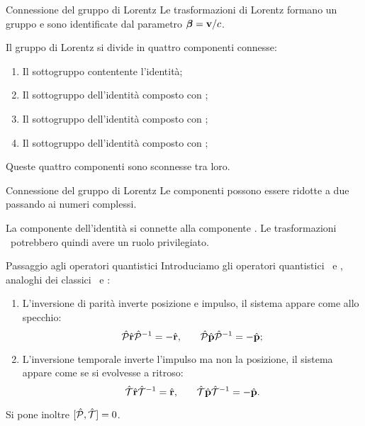 \begin{frame}{Connessione del gruppo di Lorentz}
    Le trasformazioni di Lorentz formano un gruppo e sono identificate dal parametro $\vb*{\beta} = \vb{v}/c$.

    \pause
    Il gruppo di Lorentz si divide in quattro componenti connesse:
    \begin{enumerate}[label=\mybullet]
        \pause
        \item Il sottogruppo contentente l'identità;
        \pause
        \item Il sottogruppo dell'identità composto con \mcP;
        \item Il sottogruppo dell'identità composto con \mcT;
        \item Il sottogruppo dell'identità composto con \mcP\mcT;
    \end{enumerate}
    \pause
    Queste quattro componenti sono sconnesse tra loro.
    
        
\end{frame}

\begin{frame}{Connessione del gruppo di Lorentz}
    Le componenti possono essere ridotte a due passando ai numeri complessi.
    \begin{figure}
        \qquad\pause
    \end{figure}
    \pause
    La componente dell'identità si connette alla componente \PT.
    \pause
    Le trasformazioni \PT\ potrebbero quindi avere un ruolo privilegiato.
\end{frame}

\begin{frame}{Passaggio agli operatori quantistici}
    Introduciamo gli operatori quantistici \hP\ e \hT, analoghi dei classici \mcP\ e \mcT :
    \begin{enumerate}[label=\mybullet]
        \pause
        \item L'inversione di parità inverte posizione e impulso, il sistema appare come allo specchio:
            \begin{equation*}
                \mathcal{\hat{P}}\hat{\vb{r}}\mathcal{\hat{P}}^{-1} = -\hat{\vb{r}}
                \text{,}
                \qquad
                \mathcal{\hat{P}}\hat{\vb{p}}\mathcal{\hat{P}}^{-1} = -\hat{\vb{p}}
                \text{;}
            \end{equation*}
        \pause
        \item L'inversione temporale inverte l'impulso ma non la posizione, il sistema appare come se si evolvesse a ritroso:
            \begin{equation*}
                \mathcal{\hat{T}}\hat{\vb{r}}\mathcal{\hat{T}}^{-1} = \hat{\vb{r}}
                \text{,}
                \qquad
                \mathcal{\hat{T}}\hat{\vb{p}}\mathcal{\hat{T}}^{-1} = -\hat{\vb{p}}
                \text{.}
            \end{equation*}
    \end{enumerate}
    \pause
    Si pone inoltre $\comm*{\hP}{\hT}\! = 0$.
\end{frame}

